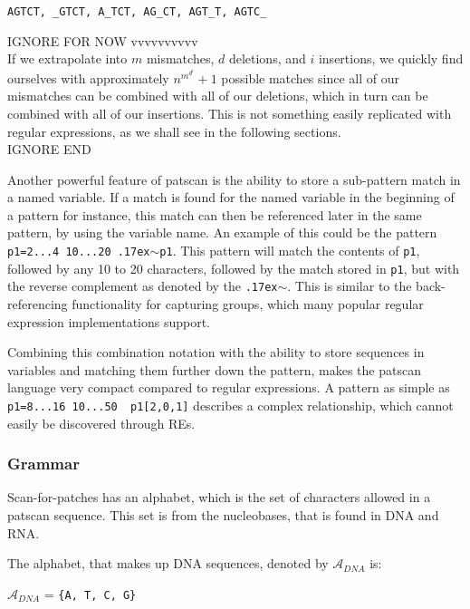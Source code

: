 \documentclass[12pt]{article}
\theoremstyle{definition}
\begin{document}
\texttt{AGTCT, \_GTCT, A\_TCT, AG\_CT, AGT\_T, AGTC\_}

IGNORE FOR NOW vvvvvvvvvv\\
If we extrapolate into $m$ mismatches, $d$ deletions, and $i$ insertions, we quickly find ourselves with approximately $n^{m^{d^{i}}}+1$ possible matches since all of our mismatches can be combined with all of our deletions, which in turn can be combined with all of our insertions. This is not something easily replicated with regular expressions, as we shall see in the following sections.\\
IGNORE END

Another powerful feature of patscan is the ability to store a sub-pattern match in a named variable. If a match is found for the named variable in the beginning of a pattern for instance, this match can then be referenced later in the same pattern, by using the variable name. An example of this could be the pattern \texttt{p1=2...4 10...20 {\raise.17ex\hbox{$\scriptstyle\mathtt{\sim}$}}p1}. This pattern will match the contents of \texttt{p1}, followed by any 10 to 20 characters, followed by the match stored in \texttt{p1}, but with the reverse complement as denoted by the \texttt{{\raise.17ex\hbox{$\scriptstyle\mathtt{\sim}$}}}. This is similar to the back-referencing functionality for capturing groups, which many popular regular expression implementations support.%

Combining this combination notation with the ability to store sequences in variables and matching them further down the pattern, makes the patscan language very compact compared to regular expressions. A pattern as simple as \texttt{p1=8...16 10...50 ~p1[2,0,1]} describes a complex relationship, which cannot easily be discovered through REs.

\subsubsection{Grammar}
\label{Patscan grammar}
Scan-for-patches has an alphabet, which is the set of characters allowed in a patscan sequence. This set is from the nucleobases, that is found in DNA and RNA.
\begin{definition}
The alphabet, that makes up DNA sequences, denoted by $\mathcal{A}_{DNA}$ is:
\begin{center}
$\mathcal{A}_{DNA}$ = \texttt{\{A, T, C, G\}}
\end{center}
\end{definition}
\end{document}
